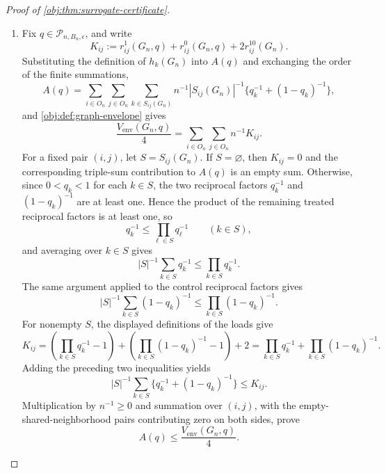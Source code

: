 \begin{proof}[Proof of \cref{obj:thm:surrogate-certificate}]
\begin{enumerate}
\item Fix \(q\in\mathcal P_{n,B_n,\epsilon}\), and write
\[
K_{ij}:=r_{ij}^1(G_n,q)+r_{ij}^0(G_n,q)+2r_{ij}^{10}(G_n).
\]
Substituting the definition of \(h_k(G_n)\) into \(A(q)\) and exchanging the order of the finite summations,
\[
A(q)=\sum_{i\in O_n}\sum_{j\in O_n}\sum_{k\in S_{ij}(G_n)}
 n^{-1}|S_{ij}(G_n)|^{-1}
 \{q_k^{-1}+(1-q_k)^{-1}\},
\]
and \cref{obj:def:graph-envelope} gives
\[
\frac{V_{\mathrm{env}}(G_n,q)}4
=\sum_{i\in O_n}\sum_{j\in O_n}n^{-1}K_{ij}.
\]
For a fixed pair \((i,j)\), let \(S=S_{ij}(G_n)\).  If \(S=\varnothing\), then \(K_{ij}=0\) and the corresponding
triple-sum contribution to \(A(q)\) is an empty sum.  Otherwise, since \(0<q_k<1\) for each \(k\in S\), the two reciprocal factors
\(q_k^{-1}\) and \((1-q_k)^{-1}\) are at least one.  Hence the product of the remaining treated reciprocal factors is at least one, so
\[
q_k^{-1}\leq\prod_{\ell\in S}q_\ell^{-1}\qquad(k\in S),
\]
and averaging over \(k\in S\) gives
\[
|S|^{-1}\sum_{k\in S}q_k^{-1}\leq\prod_{k\in S}q_k^{-1}.
\]
The same argument applied to the control reciprocal factors gives
\[
|S|^{-1}\sum_{k\in S}(1-q_k)^{-1}\leq\prod_{k\in S}(1-q_k)^{-1}.
\]
For nonempty \(S\), the displayed definitions of the loads give
\[
K_{ij}=\left(\prod_{k\in S}q_k^{-1}-1\right)+\left(\prod_{k\in S}(1-q_k)^{-1}-1\right)+2
=\prod_{k\in S}q_k^{-1}+\prod_{k\in S}(1-q_k)^{-1}.
\]
Adding the preceding two inequalities yields
\[
|S|^{-1}\sum_{k\in S}\{q_k^{-1}+(1-q_k)^{-1}\}\leq K_{ij}.
\]
Multiplication by \(n^{-1}\geq0\) and summation over \((i,j)\), with the empty-shared-neighborhood pairs contributing zero on both sides, prove
\[
A(q)\leq \frac{V_{\mathrm{env}}(G_n,q)}4.
\]


\end{enumerate}
\end{proof}
